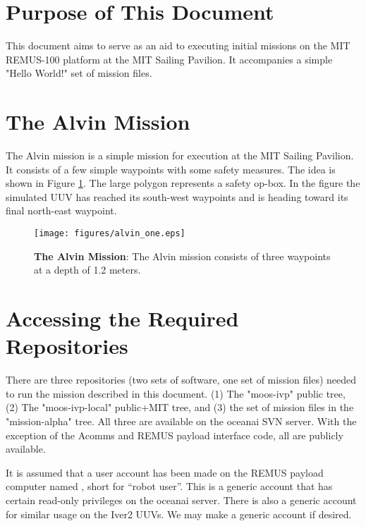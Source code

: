 \section{Purpose of This Document}

This document aims to serve as an aid to executing initial missions
on the MIT REMUS-100 platform at the MIT Sailing Pavilion. It 
accompanies a simple "Hello World!" set of mission files.

\section{The Alvin Mission}

The Alvin mission is a simple mission for execution at the MIT
Sailing Pavilion. It consists of a few simple waypoints with 
some safety measures. The idea is shown in Figure \ref{fig_alvin_one}.
The large polygon represents a safety op-box. In the figure the 
simulated UUV has reached its south-west waypoints and is heading
toward its final north-east waypoint.

\vspace{0.15in}
\begin{figure}[H]
\centering 
\texttt{[image: figures/alvin\_one.eps]}
\caption{{\bf The Alvin Mission}: The Alvin mission consists of three
  waypoints at a depth of 1.2 meters.}
\label{fig_alvin_one}
\end{figure}
\vspace{0.1in}

\section{Accessing the Required Repositories}

There are three repositories (two sets of software, one set of mission
files) needed to run the mission described in this document. (1) The 
"moos-ivp" public tree, (2) The "moos-ivp-local" public+MIT tree, 
and (3) the set of mission files in the "mission-alpha" tree. All 
three are available on the oceanai SVN server. With the exception of
the Acomms and REMUS payload interface code, all are publicly available. 

\pskip

It is assumed that a user account has been made on the REMUS payload
computer named , short for ``robot user''. This is a
generic account that has certain read-only privileges on the oceanai
server. There is also a generic  account for similar usage
on the Iver2 UUVs. We may make a generic  account if
desired.

